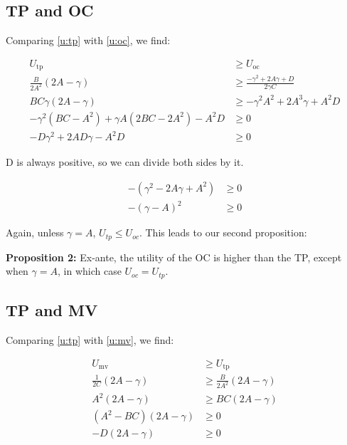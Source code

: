 \documentclass[12pt,oneside,a4paper]{memoir}
\begin{document}
\subsection*{TP and OC}

Comparing \eqref{u:tp} with \eqref{u:oc}, we find:

\begin{align*}
U_{\mathrm{tp}} & \geq U_{\mathrm{oc}}
\\
\frac{B}{2A^2} (2A - \gamma) & \geq	\frac{-\gamma^2 + 2A\gamma + D}{2\gamma C} 
\\
BC \gamma (2A - \gamma) & \geq -\gamma^2A^2 + 2A^3\gamma + A^2 D
\\
- \gamma^2(BC - A^2) + \gamma A(2BC - 2A^2) - A^2 D & \geq 0
\\
-D \gamma^2 + 2AD \gamma - A^2 D & \geq 0
\end{align*}

\noindent 
D is always positive, so we can divide both sides by it.

\vspace{-1 em}
\begin{align*}
-(\gamma^2 - 2A \gamma + A^2) & \geq 0
\\
-(\gamma - A)^2 & \geq 0
\end{align*}

\noindent
Again, unless $\gamma = A$, $U_{tp}  \leq U_{oc}$.
This leads to our second proposition:

\noindent
\textbf{Proposition 2:}
Ex-ante, the utility of the OC is higher than the TP, except when $\gamma = A$, in which case $U_{oc}=U_{tp}$.\\

\subsection*{TP and MV}
Comparing \eqref{u:tp} with \eqref{u:mv}, we find:

\begin{align*}
U_{\mathrm{mv}} & \geq U_{\mathrm{tp}}
\\
\frac{1}{2C} (2A- \gamma) & \geq \frac{B}{2A^2} (2A - \gamma) 
\\
A^2(2A- \gamma) & \geq BC (2A - \gamma)
\\
(A^2-BC)(2A- \gamma) & \geq 0
\\
-D(2A- \gamma) & \geq 0
\end{align*}
\end{document}
